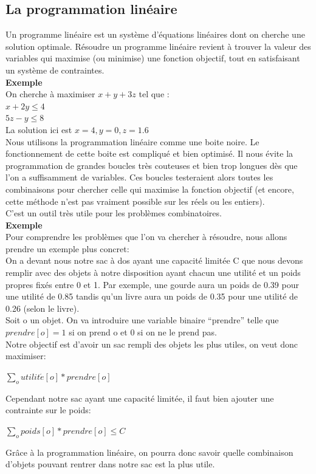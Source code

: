 \documentclass[a4paper]{article}
\begin{document}
\subsection{La programmation linéaire}
  Un programme linéaire est un système d’équations linéaires dont on cherche une solution optimale. Résoudre un programme linéaire revient à trouver la valeur des variables qui maximise (ou minimise) une fonction objectif, tout en satisfaisant un système de contraintes.\vspace{1\baselineskip}\\
\textbf{Exemple}\\
  On cherche à maximiser $x + y + 3z$ tel que : \\
  $x + 2y \leq 4$\\
  $5z - y \leq 8$\\
  La solution ici est $x = 4, y = 0, z = 1.6$\vspace{1\baselineskip}\\
Nous utilisons la programmation linéaire comme une boite noire. Le fonctionnement de cette boite est compliqué et bien optimisé. Il nous évite la programmation de grandes boucles très couteuses et bien trop longues dès que l'on a suffisamment de variables. Ces boucles testeraient alors toutes les combinaisons pour chercher celle qui maximise la fonction objectif (et encore, cette méthode n'est pas vraiment possible sur les réels ou les entiers).\\
C'est un outil très utile pour les problèmes combinatoires.\vspace{1\baselineskip}\\
\textbf{Exemple}\\
  Pour comprendre les problèmes que l'on va chercher à résoudre, nous allons prendre un exemple plus concret:\vspace{1\baselineskip} \\
  On a devant nous notre sac à dos ayant une capacité limitée C que nous devons remplir avec des objets à notre disposition ayant chacun une utilité et un poids propres fixés entre 0 et 1. Par exemple, une gourde aura un poids de 0.39 pour une utilité de 0.85 tandis qu'un livre aura un poids de 0.35 pour une utilité de 0.26 (selon le livre).\vspace{1\baselineskip}\\
  Soit o un objet. On va introduire une variable binaire ``prendre'' telle que $prendre[o]=1$ si on prend o et 0 si on ne le prend pas. \\
  Notre objectif est d'avoir un sac rempli des objets les plus utiles, on veut donc maximiser:
  \begin{center}
    $\sum_o utilit\acute{e}[o] * prendre[o]$
  \end{center}
  Cependant notre sac ayant une capacité limitée, il faut bien ajouter une contrainte sur le poids:
  \begin{center}
    $\sum_o poids[o] * prendre[o] \leq C$
  \end{center}
  Grâce à la programmation linéaire, on pourra donc savoir quelle combinaison d'objets pouvant rentrer dans notre sac est la plus utile.
\newpage
\end{document}

